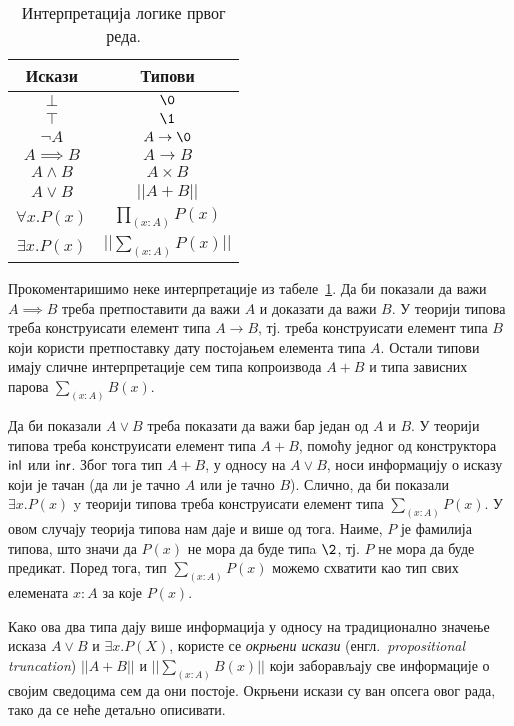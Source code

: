 \documentclass[12pt,oneside]{memoir}
\begin{document}
\begin{table}
    \begin{center}
        \begin{tabular}[c]{c c}
            Искази & Типови \\
            \hline%
            $\bot$ & $\0$ \\
            $\top$ & $\1$ \\
            $\neg A$ & $A \to \0$ \\
            $A \implies B$ & $A \to B$ \\
            $A \land B$ & $A \times B$ \\
            $A \lor B$ & $|| A + B ||$ \\
            $\forall x. P(x)$ & $\prod_{(x : A)} P(x)$ \\
            $\exists x. P(x)$ & $|| \sum_{(x : A)} P(x) ||$
        \end{tabular}
    \end{center}
    \caption{Интерпретација логике првог реда.}
    \label{table:curry_howard}
\end{table}

Прокоментаришимо неке интерпретације из табеле~\ref{table:curry_howard}. Да би показали да важи $A \implies B$ треба претпоставити да важи $A$ и доказати да важи $B$. У теорији типова треба конструисати елемент типа $A \to B$, тј. треба конструисати елемент типа $B$ који користи претпоставку дату постојањем елемента типа $A$. Остали типови имају сличне интерпретације сем типа копроизвода $A + B$ и типа зависних парова $\sum_{(x : A)} B(x)$. 

Да би показали $A \lor B$ треба показати да важи бар један од $A$ и $B$. У теорији типова треба конструисати елемент типа $A + B$, помоћу једног од конструктора $\mathsf{inl}$ или $\mathsf{inr}$. Због тога тип $A + B$, у односу на $A \lor B$, носи информацију о исказу који је тачан (да ли је тачно $A$ или је тачно $B$). Слично, да би показали $\exists x. P(x)$ y теорији типова треба конструисати елемент типа $\sum_{(x : A)} P(x)$. У овом случају теорија типова нам даје и више од тога. Наиме, $P$ је фамилија типова, што значи да $P(x)$ не мора да буде типa $\2$, тј. $P$ не мора да буде предикат. Поред тога, тип $\sum_{(x : A)} P(x)$ можемо схватити као тип свих елемената $x : A$ за које $P (x)$. 

Како ова два типа дају више информација у односу на традиционално значење исказа $A \lor B$ и $\exists x. P(X)$, користе се \emph{окрњени искази} (енгл.~\emph{propositional truncation}) $|| A + B ||$ и $|| \sum_{(x:A)} B(x) ||$ који заборављају све информације о својим сведоцима сем да они постоје. Окрњени искази су ван опсега овог рада, тако да се неће детаљно описивати.
\end{document}
